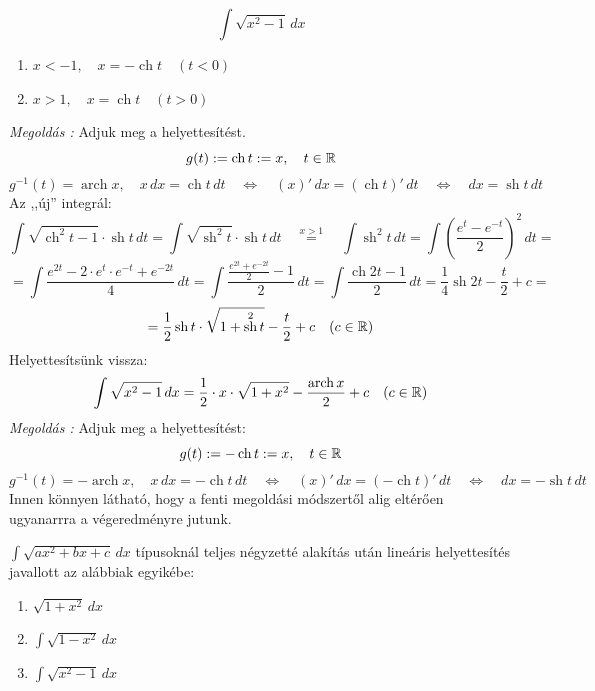 \documentclass[a4paper,11.5pt]{article}
\DeclareMathOperator{\sh}{sh}
\DeclareMathOperator{\ch}{ch}
\DeclareMathOperator{\arch}{arch}
\begin{document}
	\begin{exercise}
		\[ \int\sqrt{x^2-1}\,dx \]
		\begin{enumerate}
			\item $x<-1,\quad x=-\ch t \quad (t<0)$
			\item $x>1,\quad x=\ch t \quad (t>0)$
		\end{enumerate}
		\textit{Megoldás :} Adjuk meg a helyettesítést.
		\[ g(t):=\ch t:=x, \quad t\in\R \]
		\[ g^{-1}(t)=\arch x,\quad x\,dx=\ch t\,dt\quad \Leftrightarrow\quad (x)'\,dx=(\ch t)'\,dt\quad \Leftrightarrow\quad dx=\sh t\,dt \]
		Az ,,új'' integrál:
		\[ \int\sqrt{\ch^2t-1}\cdot\sh t\,dt=\int\sqrt{\sh^2t}\cdot\sh t\,dt\quad \overset{x>1}{=}\quad \int\sh^2t\,dt=\int\left(\frac{e^t-e^{-t}}{2}\right)^2\,dt=\]
		\[=\int\frac{e^{2t}-2\cdot e^{t}\cdot e^{-t}+e^{-2t} }{4}\,dt=\int\frac{\frac{e^{2t}+e^{-2t}}{2}-1}{2}\,dt=\int\frac{\ch2t-1}{2}\,dt=\frac{1}{4}\sh2t-\frac{t}{2}+c=\]
		\[=\frac{1}{2}\sh t\cdot\sqrt{1+\sh^2 t}-\frac{t}{2}+c\quad (c\in\R) \]
		Helyettesítsünk vissza:
		\[ \int\sqrt{x^2-1}\,dx=\frac{1}{2}\cdot x\cdot\sqrt{1+x^2}-\frac{\arch x}{2}+c\quad (c\in\R) \]
		\textit{Megoldás :} Adjuk meg a helyettesítést:
		\[ g(t):=-\ch t:=x, \quad t\in\R \]
		\[ g^{-1}(t)=-\arch x,\quad x\,dx=-\ch t\,dt\quad \Leftrightarrow\quad (x)'\,dx=(-\ch t)'\,dt\quad \Leftrightarrow\quad dx=-\sh t\,dt \]
		Innen könnyen látható, hogy a fenti megoldási módszertől alig eltérően ugyanarrra a végeredményre jutunk.
	\end{exercise}
	\begin{note}
		$\int\sqrt{ax^2+bx+c}\,dx$ típusoknál teljes négyzetté alakítás után lineáris helyettesítés javallott az alábbiak egyikébe:
		\begin{enumerate}
			\item $\sqrt{1+x^2}\,dx$
			\item $\int\sqrt{1-x^2}\,dx$
			\item $\int\sqrt{x^2-1}\,dx$
		\end{enumerate}
	\end{note}
\end{document}
